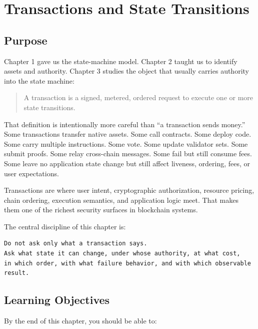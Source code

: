 \chapter{Transactions and State Transitions}

\section{Purpose}

Chapter 1 gave us the state-machine model. Chapter 2 taught us to
identify assets and authority. Chapter 3 studies the object that usually
carries authority into the state machine:

\begin{quote}
A transaction is a signed, metered, ordered request to execute one or
more state transitions.
\end{quote}

That definition is intentionally more careful than ``a transaction sends
money.'' Some transactions transfer native assets. Some call contracts.
Some deploy code. Some carry multiple instructions. Some vote. Some
update validator sets. Some submit proofs. Some relay cross-chain
messages. Some fail but still consume fees. Some leave no application
state change but still affect liveness, ordering, fees, or user
expectations.

Transactions are where user intent, cryptographic authorization,
resource pricing, chain ordering, execution semantics, and application
logic meet. That makes them one of the richest security surfaces in
blockchain systems.

The central discipline of this chapter is:

\begin{lstlisting}
Do not ask only what a transaction says.
Ask what state it can change, under whose authority, at what cost,
in which order, with what failure behavior, and with which observable result.
\end{lstlisting}

\section{Learning Objectives}

By the end of this chapter, you should be able to:


